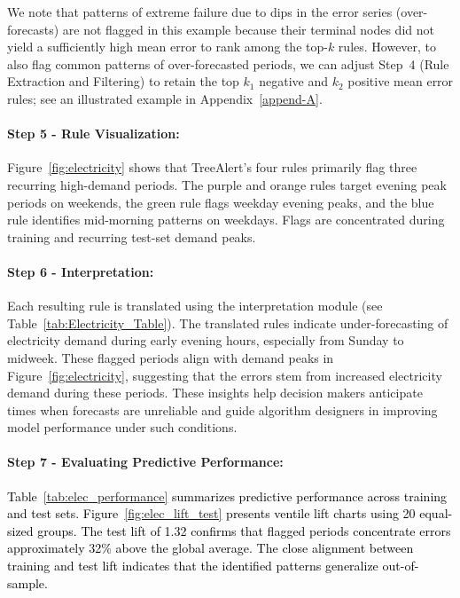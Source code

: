 \documentclass[]{interact}
\theoremstyle{plain}
\theoremstyle{definition}
\theoremstyle{remark}
\newcommand{\matt}[1]{\textcolor{black}{#1}}
\begin{document}
We note that patterns of extreme failure due to dips in the error series (over-forecasts)
are not flagged in this example because their terminal nodes did not yield a sufficiently
high mean error to rank among the top-$k$ rules. However, to also flag common patterns of
over-forecasted periods, we can adjust Step~4 (Rule Extraction and Filtering) to retain the
top $k_1$ negative and $k_2$ positive mean error rules; see an illustrated example in
Appendix~\ref{append-A}.

\paragraph{Step 5 - Rule Visualization:}
Figure~\ref{fig:electricity} shows that TreeAlert's four rules primarily flag three
recurring high-demand periods. The purple and orange rules target evening peak periods on
weekends, the green rule flags weekday evening peaks, and the blue rule identifies
mid-morning patterns on weekdays. Flags are concentrated during training and recurring
test-set demand peaks.

\paragraph{Step 6 - Interpretation:}
Each resulting rule is translated using the interpretation module (see
Table~\ref{tab:Electricity_Table}). The translated rules indicate under-forecasting of
electricity demand during early evening hours, especially from Sunday to midweek. These
flagged periods align with demand peaks in Figure~\ref{fig:electricity}, suggesting that
the errors stem from increased electricity demand during these periods. These insights help
decision makers anticipate times when forecasts are unreliable and guide algorithm designers
in improving model performance under such conditions.

\paragraph{Step 7 - Evaluating Predictive Performance:}

\matt{Table~\ref{tab:elec_performance} summarizes predictive performance across training and
test sets. Figure~\ref{fig:elec_lift_test} presents ventile lift charts using 20 equal-sized
groups. The test lift of 1.32 confirms that flagged periods concentrate errors approximately
32\% above the global average. The close alignment between training and test lift indicates
that the identified patterns generalize out-of-sample.}
\end{document}
